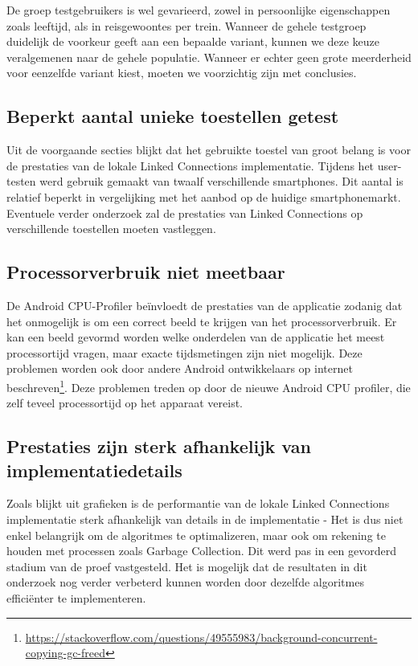 De groep testgebruikers is wel gevarieerd, zowel in persoonlijke eigenschappen zoals leeftijd, als in reisgewoontes per trein. Wanneer de gehele testgroep duidelijk de voorkeur geeft aan een bepaalde variant, kunnen we deze keuze veralgemenen naar de gehele populatie. Wanneer er echter geen grote meerderheid voor eenzelfde variant kiest, moeten we voorzichtig zijn met conclusies.

\subsection{Beperkt aantal unieke toestellen getest}
Uit de voorgaande secties blijkt dat het gebruikte toestel van groot belang is voor de prestaties van de lokale Linked Connections implementatie. Tijdens het user-testen werd gebruik gemaakt van twaalf verschillende smartphones. Dit aantal is relatief beperkt in vergelijking met het aanbod op de huidige smartphonemarkt. Eventuele verder onderzoek zal de prestaties van Linked Connections op verschillende toestellen moeten vastleggen.

\subsection{Processorverbruik niet meetbaar}
De Android CPU-Profiler beïnvloedt de prestaties van de applicatie zodanig dat het onmogelijk is om een correct beeld te krijgen van het processorverbruik. Er kan een beeld gevormd worden welke onderdelen van de applicatie het meest processortijd vragen, maar exacte tijdsmetingen zijn niet mogelijk. Deze problemen worden ook door andere Android ontwikkelaars op internet beschreven\footnote{\url{https://stackoverflow.com/questions/49555983/background-concurrent-copying-gc-freed}}. Deze problemen treden op door de nieuwe Android CPU profiler, die zelf teveel processortijd op het apparaat vereist.

\subsection{Prestaties zijn sterk afhankelijk van implementatiedetails}
Zoals blijkt uit grafieken %
is de performantie van de lokale Linked Connections implementatie sterk afhankelijk van details in de implementatie - Het is dus niet enkel belangrijk om de algoritmes te optimalizeren, maar ook om rekening te houden met processen zoals Garbage Collection. Dit werd pas in een gevorderd stadium van de proef vastgesteld. Het is mogelijk dat de resultaten in dit onderzoek nog verder verbeterd kunnen worden door dezelfde algoritmes efficiënter te implementeren.

